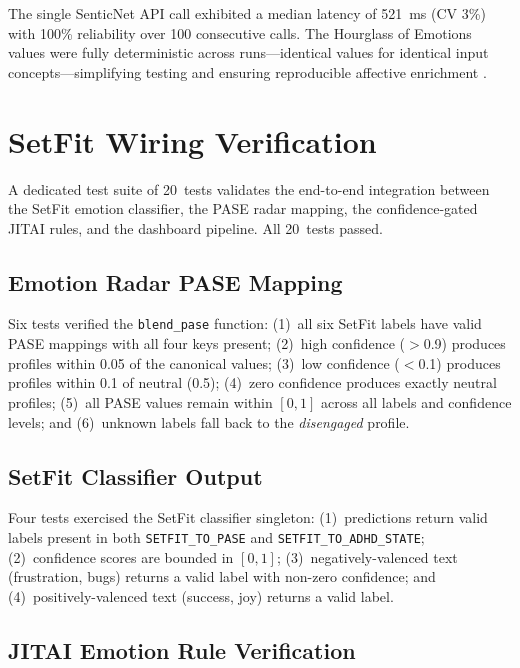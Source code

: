 The single SenticNet API call exhibited a median latency of 521~ms (CV 3\%) with 100\% reliability over 100 consecutive calls. The Hourglass of Emotions values were fully deterministic across runs---identical values for identical input concepts---simplifying testing and ensuring reproducible affective enrichment \cite{cambria2024, cambria2016}.

\section{SetFit Wiring Verification}
\label{sec:setfit-wiring-evaluation}

A dedicated test suite of 20~tests validates the end-to-end integration between the SetFit emotion classifier, the PASE radar mapping, the confidence-gated JITAI rules, and the dashboard pipeline. All 20~tests passed.

\subsection{Emotion Radar PASE Mapping}
\label{subsec:pase-tests}

Six tests verified the \texttt{blend\_pase} function: (1)~all six SetFit labels have valid PASE mappings with all four keys present; (2)~high confidence ($>$0.9) produces profiles within 0.05 of the canonical values; (3)~low confidence ($<$0.1) produces profiles within 0.1 of neutral (0.5); (4)~zero confidence produces exactly neutral profiles; (5)~all PASE values remain within $[0, 1]$ across all labels and confidence levels; and (6)~unknown labels fall back to the \emph{disengaged} profile.

\subsection{SetFit Classifier Output}
\label{subsec:setfit-output-tests}

Four tests exercised the SetFit classifier singleton: (1)~predictions return valid labels present in both \texttt{SETFIT\_TO\_PASE} and \texttt{SETFIT\_TO\_ADHD\_STATE}; (2)~confidence scores are bounded in $[0, 1]$; (3)~negatively-valenced text (frustration, bugs) returns a valid label with non-zero confidence; and (4)~positively-valenced text (success, joy) returns a valid label.

\subsection{JITAI Emotion Rule Verification}
\label{subsec:jitai-emotion-tests}

